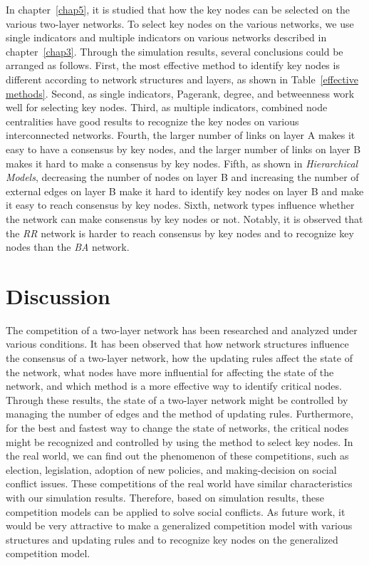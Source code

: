 In chapter~\ref{chap5}, it is studied that how the key nodes can be selected on the various two-layer networks. To select key nodes on the various networks, we use single indicators and multiple indicators on various networks described in chapter~\ref{chap3}. Through the simulation results, several conclusions could be arranged as follows. First, the most effective method to identify key nodes is different according to network structures and layers, as shown in Table~\ref{effective methods}. Second, as single indicators, Pagerank, degree, and betweenness work well for selecting key nodes. Third, as multiple indicators, combined node centralities have good results to recognize the key nodes on various interconnected networks. Fourth, the larger number of links on layer A makes it easy to have a consensus by key nodes, and the larger number of links on layer B makes it hard to make a consensus by key nodes. Fifth, as shown in \textit{Hierarchical Models}, decreasing the number of nodes on layer B and increasing the number of external edges on layer B make it hard to identify key nodes on layer B and make it easy to reach consensus by key nodes. Sixth, network types influence whether the network can make consensus by key nodes or not. Notably, it is observed that the \textit{RR} network is harder to reach consensus by key nodes and to recognize key nodes than the \textit{BA} network. \\
  
\section{Discussion} 
The competition of a two-layer network has been researched and analyzed under various conditions. It has been observed that how network structures influence the consensus of a two-layer network, how the updating rules affect the state of the network, what nodes have more influential for affecting the state of the network, and which method is a more effective way to identify critical nodes. Through these results, the state of a two-layer network might be controlled by managing the number of edges and the method of updating rules. Furthermore, for the best and fastest way to change the state of networks, the critical nodes might be recognized and controlled by using the method to select key nodes.
In the real world, we can find out the phenomenon of these competitions, such as election, legislation, adoption of new policies, and making-decision on social conflict issues. These competitions of the real world have similar characteristics with our simulation results. Therefore, based on simulation results, these competition models can be applied to solve social conflicts. As future work, it would be very attractive to make a generalized competition model with various structures and updating rules and to recognize key nodes on the generalized competition model.\\   


